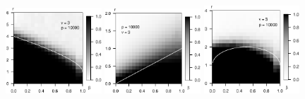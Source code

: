 \begin{figure}
	\includegraphics[width=0.32\textwidth]{sim_strong_boundary/simulated_strong_boundary_chi-squared_nu3_p10000.eps}
    \includegraphics[width=0.32\textwidth]{sim_weak_boundary/simulated_weak_boundary_chi-squared_nu3_p10000.eps}
    \includegraphics[width=0.32\textwidth]{sim_approx-exact_boundary/simulated_approx-exact_boundary_chi-squared_nu3_p10000.eps}
	

\end{figure}
